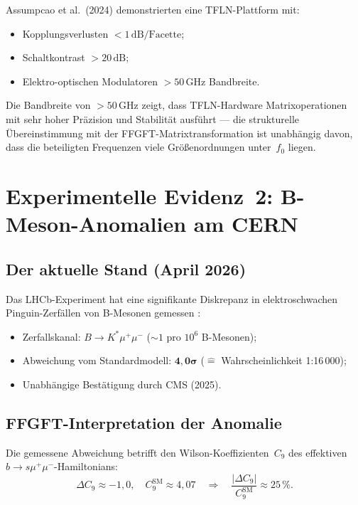 Assumpcao et al.\ (2024) \cite{Assumpcao2024} demonstrierten eine
TFLN-Plattform mit:
\begin{itemize}
  \item Kopplungsverlusten $< 1\,\text{dB/Facette}$;
  \item Schaltkontrast $> 20\,\text{dB}$;
  \item Elektro-optischen Modulatoren $> 50\,\text{GHz}$ Bandbreite.
\end{itemize}
Die Bandbreite von $>50\,\text{GHz}$ zeigt, dass TFLN-Hardware
Matrixoperationen mit sehr hoher Präzision und Stabilität ausführt —
die strukturelle Übereinstimmung mit der FFGFT-Matrixtransformation
ist unabhängig davon, dass die beteiligten Frequenzen viele
Größenordnungen unter~$f_0$ liegen.

\section{Experimentelle Evidenz~2: B-Meson-Anomalien am CERN}

\subsection{Der aktuelle Stand (April 2026)}

Das LHCb-Experiment hat eine signifikante Diskrepanz in elektroschwachen
Pinguin-Zerfällen von B-Mesonen gemessen \cite{CERN2026a,CERN2026b}:

\begin{itemize}
  \item Zerfallskanal: $B \to K^*\mu^+\mu^-$ ($\sim 1$ pro $10^6$ B-Mesonen);
  \item Abweichung vom Standardmodell: $\symbf{4{,}0\sigma}$
        ($\hat{=}$ Wahrscheinlichkeit 1:16\,000);
  \item Unabhängige Bestätigung durch CMS (2025).
\end{itemize}

\subsection{FFGFT-Interpretation der Anomalie}

Die gemessene Abweichung betrifft den Wilson-Koeffizienten~$C_9$
des effektiven $b \to s\mu^+\mu^-$-Hamiltonians:
\begin{equation}
  \Delta C_9 \approx -1{,}0, \quad
  C_9^{\text{SM}} \approx 4{,}07
  \quad\Rightarrow\quad
  \frac{|\Delta C_9|}{C_9^{\text{SM}}} \approx 25\,\%.
\end{equation}

